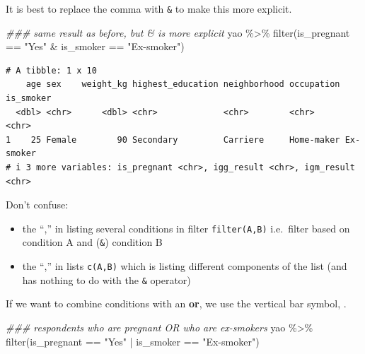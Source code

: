 \documentclass[
  letterpaper,
  DIV=11,
  numbers=noendperiod]{scrreprt}
\newenvironment{Shaded}{\begin{snugshade}}{\end{snugshade}}
\newcommand{\DocumentationTok}[1]{\textcolor[rgb]{0.37,0.37,0.37}{\textit{#1}}}
\newcommand{\FunctionTok}[1]{\textcolor[rgb]{0.28,0.35,0.67}{#1}}
\newcommand{\NormalTok}[1]{\textcolor[rgb]{0.00,0.23,0.31}{#1}}
\newcommand{\SpecialCharTok}[1]{\textcolor[rgb]{0.37,0.37,0.37}{#1}}
\newcommand{\StringTok}[1]{\textcolor[rgb]{0.13,0.47,0.30}{#1}}
\begin{document}
It is best to replace the comma with \texttt{\&} to make this more
explicit.

\begin{Shaded}
\begin{Highlighting}[]
\DocumentationTok{\#\#\# same result as before, but \textasciigrave{}\&\textasciigrave{} is more explicit}
\NormalTok{yao }\SpecialCharTok{\%\textgreater{}\%} \FunctionTok{filter}\NormalTok{(is\_pregnant }\SpecialCharTok{==} \StringTok{"Yes"} \SpecialCharTok{\&}\NormalTok{ is\_smoker }\SpecialCharTok{==} \StringTok{"Ex{-}smoker"}\NormalTok{)}
\end{Highlighting}
\end{Shaded}

\begin{verbatim}
# A tibble: 1 x 10
    age sex    weight_kg highest_education neighborhood occupation is_smoker
  <dbl> <chr>      <dbl> <chr>             <chr>        <chr>      <chr>    
1    25 Female        90 Secondary         Carriere     Home-maker Ex-smoker
# i 3 more variables: is_pregnant <chr>, igg_result <chr>, igm_result <chr>
\end{verbatim}

\begin{tcolorbox}[enhanced jigsaw, title=\textcolor{quarto-callout-note-color}{\faInfo}\hspace{0.5em}{Side Note}, colbacktitle=quarto-callout-note-color!10!white, leftrule=.75mm, arc=.35mm, opacityback=0, bottomrule=.15mm, rightrule=.15mm, toptitle=1mm, breakable, toprule=.15mm, colback=white, coltitle=black, colframe=quarto-callout-note-color-frame, bottomtitle=1mm, titlerule=0mm, left=2mm, opacitybacktitle=0.6]

Don't confuse:

\begin{itemize}
\item
  the ``,'' in listing several conditions in filter \texttt{filter(A,B)}
  i.e.~filter based on condition A and (\texttt{\&}) condition B
\item
  the ``,'' in lists \texttt{c(A,B)} which is listing different
  components of the list (and has nothing to do with the \texttt{\&}
  operator)
\end{itemize}

\end{tcolorbox}

If we want to combine conditions with an \textbf{or}, we use the
vertical bar symbol, \texttt{\textbar{}}.

\begin{Shaded}
\begin{Highlighting}[]
\DocumentationTok{\#\#\# respondents who are pregnant OR who are ex{-}smokers}
\NormalTok{yao }\SpecialCharTok{\%\textgreater{}\%} \FunctionTok{filter}\NormalTok{(is\_pregnant }\SpecialCharTok{==} \StringTok{"Yes"} \SpecialCharTok{|}\NormalTok{ is\_smoker }\SpecialCharTok{==} \StringTok{"Ex{-}smoker"}\NormalTok{)}
\end{Highlighting}
\end{Shaded}
\end{document}
